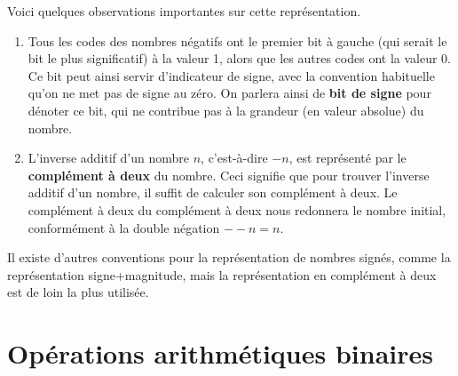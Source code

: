 \documentclass[letter, oneside]{book}
\begin{document}
Voici quelques observations importantes sur cette représentation.

\begin{enumerate}
\item Tous les codes des nombres négatifs ont le premier bit à gauche
(qui serait le bit le plus significatif) à la valeur 1, alors que
les autres codes ont la valeur 0. Ce bit peut ainsi servir
d'indicateur de signe, avec la convention habituelle qu'on ne met
pas de signe au zéro. On parlera ainsi de \textbf{bit de signe} pour
dénoter ce bit, qui ne contribue pas à la grandeur (en valeur
absolue) du nombre.

\item L'inverse additif d'un nombre \(n\), c'est-à-dire \(-n\), est
représenté par le \textbf{complément à deux} du nombre. Ceci signifie que
pour trouver l'inverse additif d'un nombre, il suffit de calculer
son complément à deux. Le complément à deux du complément à deux nous
redonnera le nombre initial, conformément à la double négation
\(--n = n\).
\end{enumerate}

Il existe d'autres conventions pour la représentation de nombres
signés, comme la représentation signe+magnitude, mais la
représentation en complément à deux est de loin la plus utilisée.

\section{Opérations arithmétiques binaires}
\label{sec:org288eb3a}
\end{document}
